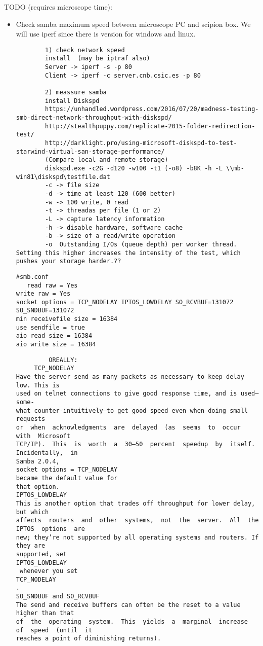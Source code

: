 \noindent
TODO (requires microscope time):
\begin{itemize}
   \item Check samba maximum speed between microscope PC and scipion box. We will use iperf since there is version for windows and linux.
   \begin{lstlisting}
        1) check network speed
        install  (may be iptraf also)
        Server -> iperf -s -p 80
        Client -> iperf -c server.cnb.csic.es -p 80
        
        2) meassure samba
        install Diskspd
        https://unhandled.wordpress.com/2016/07/20/madness-testing-smb-direct-network-throughput-with-diskspd/
        http://stealthpuppy.com/replicate-2015-folder-redirection-test/
        http://darklight.pro/using-microsoft-diskspd-to-test-starwind-virtual-san-storage-performance/
        (Compare local and remote storage)
        diskspd.exe -c2G -d120 -w100 -t1 (-o8) -b8K -h -L \\mb-win81\diskspd\testfile.dat
        -c -> file size
        -d -> time at least 120 (600 better)
        -w -> 100 write, 0 read
        -t -> threadas per file (1 or 2)
        -L -> capture latency information
        -h -> disable hardware, software cache 
        -b -> size of a read/write operation
        -o 	Outstanding I/Os (queue depth) per worker thread. Setting this higher increases the intensity of the test, which pushes your storage harder.??
    \end{lstlisting}
   
   \begin{lstlisting}
#smb.conf
   read raw = Yes
write raw = Yes
socket options = TCP_NODELAY IPTOS_LOWDELAY SO_RCVBUF=131072 SO_SNDBUF=131072
min receivefile size = 16384
use sendfile = true
aio read size = 16384
aio write size = 16384
    \end{lstlisting}
\begin{verbatim}
         OREALLY:
     TCP_NODELAY
Have the server send as many packets as necessary to keep delay low. This is
used on telnet connections to give good response time, and is used—some-
what counter-intuitively—to get good speed even when doing small requests
or  when  acknowledgments  are  delayed  (as  seems  to  occur  with  Microsoft
TCP/IP).  This  is  worth  a  30–50  percent  speedup  by  itself.  Incidentally,  in
Samba 2.0.4,
socket options = TCP_NODELAY
became the default value for
that option.
IPTOS_LOWDELAY
This is another option that trades off throughput for lower delay, but which
affects  routers  and  other  systems,  not  the  server.  All  the  IPTOS  options  are
new; they’re not supported by all operating systems and routers. If they are
supported, set
IPTOS_LOWDELAY
 whenever you set
TCP_NODELAY
.
SO_SNDBUF and SO_RCVBUF
The send and receive buffers can often be the reset to a value higher than that
of  the  operating  system.  This  yields  a  marginal  increase  of  speed  (until  it
reaches a point of diminishing returns).


\end{verbatim}
\end{itemize}
